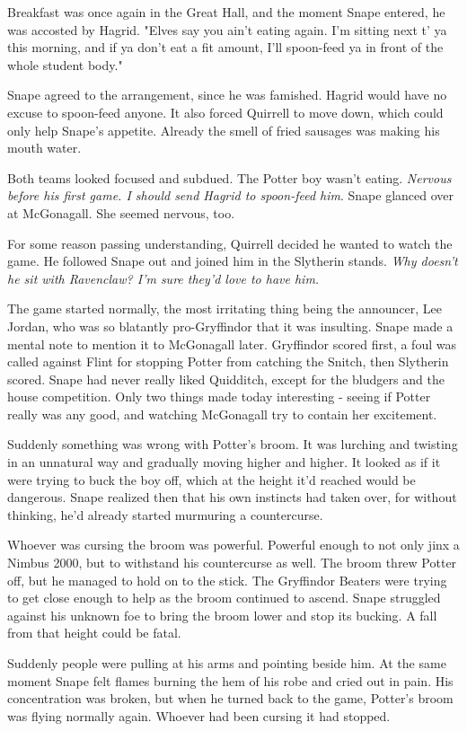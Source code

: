 \documentclass[a4paper,11pt]{article}
\begin{document}
Breakfast was once again in the Great Hall, and the moment Snape entered, he was accosted by Hagrid. "Elves say you ain't eating again. I'm sitting next t' ya this morning, and if ya don't eat a fit amount, I'll spoon-feed ya in front of the whole student body."

Snape agreed to the arrangement, since he was famished. Hagrid would have no excuse to spoon-feed anyone. It also forced Quirrell to move down, which could only help Snape's appetite. Already the smell of fried sausages was making his mouth water.

Both teams looked focused and subdued. The Potter boy wasn't eating. \emph{Nervous before his first game. I should send Hagrid to spoon-feed him}. Snape glanced over at McGonagall. She seemed nervous, too.

For some reason passing understanding, Quirrell decided he wanted to watch the game. He followed Snape out and joined him in the Slytherin stands. \emph{Why doesn't he sit with Ravenclaw? I'm sure they'd love to have him.}

The game started normally, the most irritating thing being the announcer, Lee Jordan, who was so blatantly pro-Gryffindor that it was insulting. Snape made a mental note to mention it to McGonagall later. Gryffindor scored first, a foul was called against Flint for stopping Potter from catching the Snitch, then Slytherin scored. Snape had never really liked Quidditch, except for the bludgers and the house competition. Only two things made today interesting - seeing if Potter really was any good, and watching McGonagall try to contain her excitement.

Suddenly something was wrong with Potter's broom. It was lurching and twisting in an unnatural way and gradually moving higher and higher. It looked as if it were trying to buck the boy off, which at the height it'd reached would be dangerous. Snape realized then that his own instincts had taken over, for without thinking, he'd already started murmuring a countercurse.

Whoever was cursing the broom was powerful. Powerful enough to not only jinx a Nimbus 2000, but to withstand his countercurse as well. The broom threw Potter off, but he managed to hold on to the stick. The Gryffindor Beaters were trying to get close enough to help as the broom continued to ascend. Snape struggled against his unknown foe to bring the broom lower and stop its bucking. A fall from that height could be fatal.

Suddenly people were pulling at his arms and pointing beside him. At the same moment Snape felt flames burning the hem of his robe and cried out in pain. His concentration was broken, but when he turned back to the game, Potter's broom was flying normally again. Whoever had been cursing it had stopped.
\end{document}
